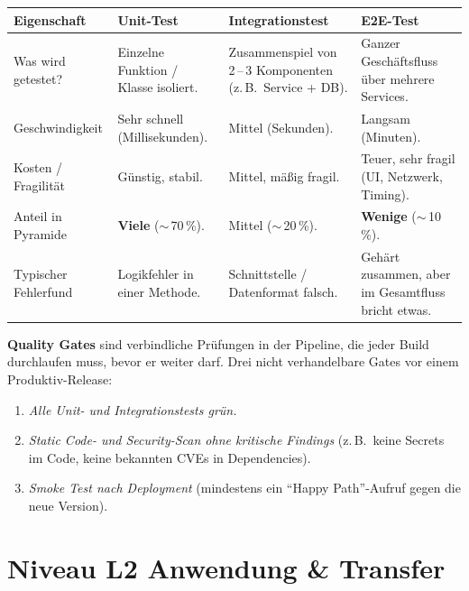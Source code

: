 \documentclass[11pt,a4paper,oneside]{article}
\begin{document}
\begin{loesungbox}
\begin{tabularx}{\linewidth}{@{}p{3.4cm}|X|X|X@{}}
\toprule
\textbf{Eigenschaft} & \textbf{Unit-Test} & \textbf{Integrationstest} & \textbf{E2E-Test} \\
\midrule
Was wird getestet? & Einzelne Funktion / Klasse isoliert. & Zusammenspiel von 2\,--\,3 Komponenten (z.\,B.\ Service + DB). & Ganzer Gesch\"aftsfluss \"uber mehrere Services. \\
\midrule
Geschwindigkeit & Sehr schnell (Millisekunden). & Mittel (Sekunden). & Langsam (Minuten). \\
\midrule
Kosten / Fragilit\"at & G\"unstig, stabil. & Mittel, m\"a{\ss}ig fragil. & Teuer, sehr fragil (UI, Netzwerk, Timing). \\
\midrule
Anteil in Pyramide & \textbf{Viele} ($\sim$\,70\,\%). & Mittel ($\sim$\,20\,\%). & \textbf{Wenige} ($\sim$\,10\,\%). \\
\midrule
Typischer Fehlerfund & Logikfehler in einer Methode. & Schnittstelle / Datenformat falsch. & Geh\"art zusammen, aber im Gesamtfluss bricht etwas. \\
\bottomrule
\end{tabularx}

\smallskip
\textbf{Quality Gates} sind verbindliche Pr\"ufungen in der Pipeline, die jeder Build durchlaufen muss, bevor er weiter darf. Drei nicht verhandelbare Gates vor einem Produktiv-Release:

\begin{enumerate}
  \item \emph{Alle Unit- und Integrationstests gr\"un.}
  \item \emph{Static Code- und Security-Scan ohne kritische Findings} (z.\,B.\ keine Secrets im Code, keine bekannten CVEs in Dependencies).
  \item \emph{Smoke Test nach Deployment} (mindestens ein ``Happy Path''-Aufruf gegen die neue Version).
\end{enumerate}
\end{loesungbox}

\clearpage

\section*{Niveau L2 \textendash{} Anwendung \& Transfer}
\end{document}
